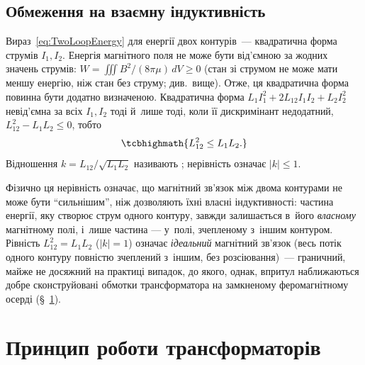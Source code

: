 \subsection*{Обмеження на взаємну індуктивність}



Вираз~\eqref{eq:TwoLoopEnergy} для енергії двох контурів~--- квадратична форма струмів
$I_1,I_2$. Енергія магнітного поля не може бути від'ємною за жодних значень струмів: $W=\iiint B^2/(8\pi\mu)\,dV\ge0$ (стан зі струмом не може мати меншу енергію, ніж стан без струму; див.~вище). Отже, ця квадратична форма повинна бути додатно визначеною. Квадратична форма $L_1I_1^2+2L_{12}I_1I_2+L_2I_2^2$ невід'ємна за всіх $I_1,I_2$ тоді й~лише тоді, коли її дискримінант недодатний, $L_{12}^2-L_1L_2\le0$, тобто
\begin{equation}\label{eq:InductanceInequality}
	\tcbhighmath{
		L_{12}^2 \le L_1L_2.
	}
\end{equation}
Відношення $k=L_{12}/\sqrt{L_1L_2}$ називають ; нерівність означає $|k|\le1$.

Фізично ця нерівність означає, що магнітний зв'язок між двома контурами не може бути
\enquote{сильнішим}, ніж дозволяють їхні власні індуктивності: частина енергії, яку
створює струм одного контуру, завжди залишається в~його \emph{власному} магнітному полі,
і~лише частина --- у~полі, зчепленому з~іншим контуром. Рівність $L_{12}^2=L_1L_2$ ($|k|=1$) означає
\emph{ідеальний} магнітний зв'язок (весь потік одного контуру повністю зчеплений з~іншим,
без розсіювання)~--- граничний, майже не досяжний на практиці випадок, до якого, однак,
впритул наближаються добре сконструйовані обмотки трансформатора на замкненому
феромагнітному осерді (\S~\ref{sec:IdealTransformer}).



\section{Принцип роботи трансформаторів}\label{sec:IdealTransformer}\hypertarget{transformer-principle}{}

